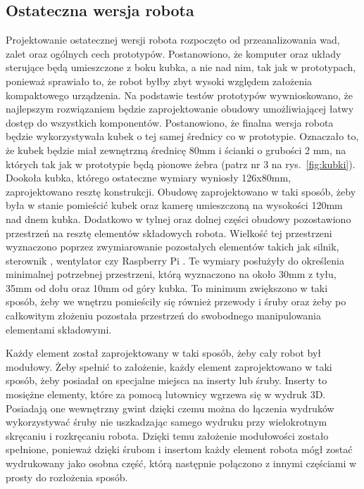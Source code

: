 \subsection{Ostateczna wersja robota}\label{subsec:ostateczna-wersja-robota}
Projektowanie ostatecznej wersji robota rozpoczęto od przeanalizowania wad, zalet oraz ogólnych cech prototypów. Postanowiono, że komputer oraz układy sterujące będą
umieszczone z boku kubka, a nie nad nim, tak jak w prototypach, ponieważ sprawiało to, że robot byłby zbyt wysoki względem założenia kompaktowego urządzenia.
Na podstawie testów prototypów wywnioskowano, że najlepszym rozwiązaniem będzie zaprojektowanie obudowy umożliwiającej łatwy dostęp do wszystkich komponentów.
Postanowiono, że finalna wersja robota będzie wykorzystywała kubek o tej samej średnicy co w prototypie. Oznaczało to, że kubek będzie miał zewnętrzną średnicę 80mm
i ścianki o grubości 2 mm, na których tak jak w prototypie będą pionowe żebra (patrz nr 3 na rys.~\ref{fig:kubki}). Dookoła kubka, którego ostateczne wymiary wyniosły 126x80mm,
zaprojektowano resztę konstrukcji. Obudowę zaprojektowano w taki sposób, żeby była w stanie pomieścić kubek oraz kamerę umieszczoną na wysokości 120mm nad dnem kubka.
Dodatkowo w tylnej oraz dolnej części obudowy pozostawiono przestrzeń na resztę
elementów składowych robota. Wielkość tej przestrzeni wyznaczono poprzez zwymiarowanie pozostałych elementów takich jak silnik, sterownik \cite{L298}, wentylator 
czy Raspberry Pi \cite{malina}. Te wymiary posłużyły do określenia minimalnej potrzebnej przestrzeni, którą wyznaczono na około 30mm z tyłu, 35mm od dołu oraz 10mm od góry kubka. To minimum 
zwiększono w taki sposób, żeby we wnętrzu pomieściły się również przewody i śruby oraz żeby po całkowitym złożeniu pozostała przestrzeń do swobodnego manipulowania
elementami składowymi.

Każdy element został zaprojektowany w taki sposób, żeby cały robot był modułowy. Żeby spełnić to założenie, każdy element
zaprojektowano w taki sposób, żeby posiadał on specjalne miejsca na inserty lub śruby. Inserty to mosiężne elementy, które za pomocą lutownicy wgrzewa się
w wydruk 3D. Posiadają one wewnętrzny gwint dzięki czemu można do łączenia wydruków wykorzystywać śruby nie uszkadzając samego wydruku przy 
wielokrotnym skręcaniu i rozkręcaniu robota. Dzięki temu założenie modułowości zostało spełnione, ponieważ dzięki śrubom i insertom każdy element robota 
mógł zostać wydrukowany jako osobna część, którą następnie połączono z innymi częściami w prosty do rozłożenia sposób.

